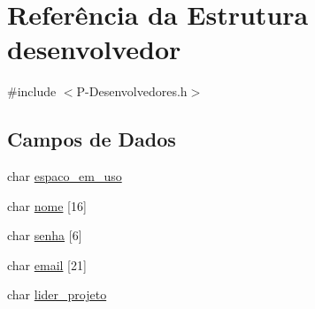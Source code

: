 \hypertarget{structdesenvolvedor}{\section{Referência da Estrutura desenvolvedor}
\label{structdesenvolvedor}
}


{\ttfamily \#include $<$P-\/\-Desenvolvedores.\-h$>$}

\subsection*{Campos de Dados}
\begin{DoxyCompactItemize}
\item 
char \hyperlink{structdesenvolvedor_ac3e8c7c6241d02565c6e336495960947}{espaco\-\_\-em\-\_\-uso}
\item 
char \hyperlink{structdesenvolvedor_a25aba59e5c950d7fdadfdb8b5f7f861d}{nome} \mbox{[}16\mbox{]}
\item 
char \hyperlink{structdesenvolvedor_a492c26f668c5dff94aaa0d91f38dde4e}{senha} \mbox{[}6\mbox{]}
\item 
char \hyperlink{structdesenvolvedor_abc1429bf9b552e0057eef7b3ecb9d3d6}{email} \mbox{[}21\mbox{]}
\item 
char \hyperlink{structdesenvolvedor_a4fa66754a685d69aea2a1b82bbae7263}{lider\-\_\-projeto}
\end{DoxyCompactItemize}


